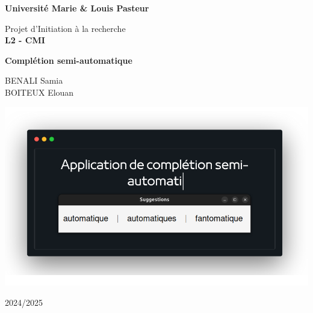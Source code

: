 \documentclass[a4paper, 11pt]{report}
\begin{document}
\begin{titlepage}
	\centering
	{\Huge \textbf{Université Marie \& Louis Pasteur} \par}
	\vspace{1cm}
	{\huge \texttt{}{Projet d'Initiation à la recherche\\ } \LARGE{\textbf{L2 - CMI}} \par}
	\vspace{1cm}
	{\huge \textbf{Complétion semi-automatique} \par}
	\vspace{1cm}
	{\Large BENALI Samia\\ BOITEUX Elouan\par}
	\vspace{0.5cm}
	\begin{center}
		{\includegraphics[height=0.55\textwidth]{images/illustration.png}}
	\end{center}

	\begin{minipage}[c]{0.40\textwidth}
		\centering
	\end{minipage}
	\hfill
	\begin{minipage}[c]{0.5\textwidth}
		\centering
	\end{minipage}
	\vfill
	{2024/2025}
\end{titlepage}
\end{document}
